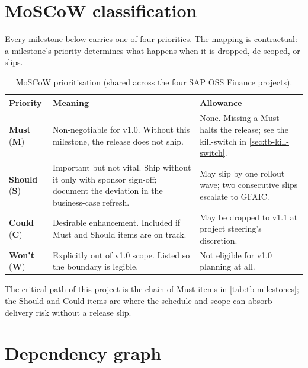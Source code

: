 \documentclass[11pt,a4paper,twoside]{report}
\begin{document}
\section{MoSCoW classification}\label{sec:tb-moscow}

Every milestone below carries one of four priorities. The mapping is
contractual: a milestone's priority determines what happens when it is
dropped, de-scoped, or slips.

\begin{table}[htbp]
\centering
\caption{MoSCoW prioritisation (shared across the four SAP OSS Finance
projects).}
\label{tab:tb-moscow}
\footnotesize
\begin{tabularx}{\linewidth}{@{}l l X@{}}
\toprule
\textbf{Priority} & \textbf{Meaning} & \textbf{Allowance} \\ \midrule
\textbf{Must} (\textbf{M}) & Non-negotiable for v1.0. Without this milestone, the release does not ship. & None. Missing a Must halts the release; see the kill-switch in \cref{sec:tb-kill-switch}. \\
\textbf{Should} (\textbf{S}) & Important but not vital. Ship without it only with sponsor sign-off; document the deviation in the business-case refresh. & May slip by one rollout wave; two consecutive slips escalate to GFAIC. \\
\textbf{Could} (\textbf{C}) & Desirable enhancement. Included if Must and Should items are on track. & May be dropped to v1.1 at project steering's discretion. \\
\textbf{Won't} (\textbf{W}) & Explicitly out of v1.0 scope. Listed so the boundary is legible. & Not eligible for v1.0 planning at all. \\
\bottomrule
\end{tabularx}
\end{table}

\noindent
The critical path of this project is the chain of Must items in
\cref{tab:tb-milestones}; the Should and Could items are where the
schedule and scope can absorb delivery risk without a release slip.

\section{Dependency graph}\label{sec:tb-dependency-graph}
\end{document}
